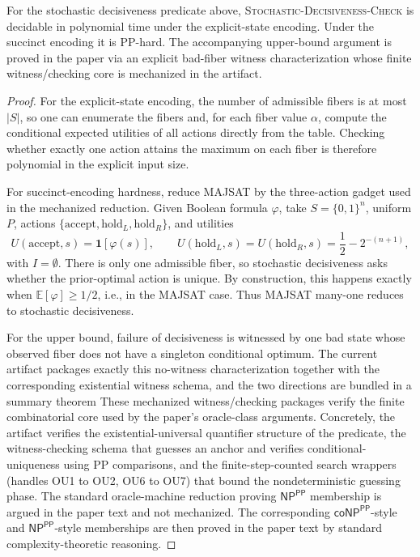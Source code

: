 \begin{theorem}\label{thm:stochastic-pp}
For the stochastic decisiveness predicate above, \textsc{Stochastic-Decisiveness-Check} is decidable in polynomial time under the explicit-state encoding. Under the succinct encoding it is PP-hard. The accompanying upper-bound argument is proved in the paper via an explicit bad-fiber witness characterization whose finite witness/checking core is mechanized in the artifact.
\end{theorem}


\begin{proof}
For the explicit-state encoding, the number of admissible fibers is at most $|S|$, so one can enumerate the fibers and, for each fiber value $\alpha$, compute the conditional expected utilities of all actions directly from the table. Checking whether exactly one action attains the maximum on each fiber is therefore polynomial in the explicit input size.

For succinct-encoding hardness, reduce MAJSAT by the three-action gadget used in the mechanized reduction. Given Boolean formula $\varphi$, take $S=\{0,1\}^n$, uniform $P$, actions $\{\mathrm{accept},\mathrm{hold}_L,\mathrm{hold}_R\}$, and utilities
\[
U(\mathrm{accept},s)=\mathbf{1}[\varphi(s)],\qquad
U(\mathrm{hold}_L,s)=U(\mathrm{hold}_R,s)=\frac12-2^{-(n+1)},
\]
with $I=\emptyset$. There is only one admissible fiber, so stochastic decisiveness asks whether the prior-optimal action is unique. By construction, this happens exactly when $\mathbb{E}[\varphi]\ge 1/2$, i.e., in the MAJSAT case. Thus MAJSAT many-one reduces to stochastic decisiveness.

For the upper bound, failure of decisiveness is witnessed by one bad state whose observed fiber does not have a singleton conditional optimum. The current artifact packages exactly this no-witness characterization together with the corresponding existential witness schema, and the two directions are bundled in a summary theorem  These mechanized witness/checking packages verify the finite combinatorial core used by the paper's oracle-class arguments. Concretely, the artifact verifies the existential-universal quantifier structure of the predicate, the witness-checking schema that guesses an anchor and verifies conditional-uniqueness using PP comparisons, and the finite-step-counted search wrappers (handles OU1 to OU2, OU6 to OU7) that bound the nondeterministic guessing phase. The standard oracle-machine reduction proving $\textsf{NP}^{\textsf{PP}}$ membership is argued in the paper text and not mechanized. The corresponding $\textsf{coNP}^{\textsf{PP}}$-style and $\textsf{NP}^{\textsf{PP}}$-style memberships are then proved in the paper text by standard complexity-theoretic reasoning.
\end{proof}

